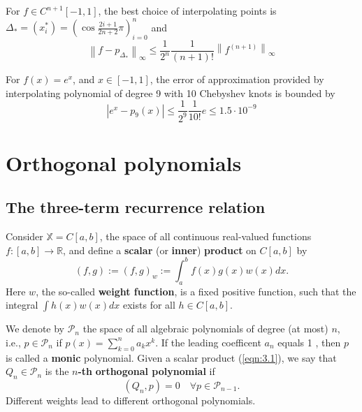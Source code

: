 \documentclass[a4paper]{article}
\begin{document}
\begin{theorem}
    For $f \in C^{n+1}[-1,1]$, the best choice of interpolating points is $\Delta_*=\left(x_i^*\right)=\left(\cos \frac{2 i+1}{2 n+2} \pi\right)_{i=0}^n$ and
    \[
    \left\|f-p_{\Delta_*}\right\|_{\infty} \leq \frac{1}{2^n} \frac{1}{(n+1) !}\left\|f^{(n+1)}\right\|_{\infty}
    \]
\end{theorem}

\begin{example}
    For $f(x)=e^x$, and $x \in[-1,1]$, the error of approximation provided by interpolating polynomial of degree 9 with 10 Chebyshev knots is bounded by
    \[
    \left|e^x-p_9(x)\right| \leq \frac{1}{2^9} \frac{1}{10 !} e \leq 1.5 \cdot 10^{-9}
    \]
\end{example}

\section{Orthogonal polynomials}
\subsection{The three-term recurrence relation}
Consider $\mathbb{X}=C[a, b]$, the space of all continuous real-valued functions $f:[a, b] \rightarrow \mathbb{R}$, and define a \textbf{scalar} (or \textbf{inner}) \textbf{product} on $C[a, b]$ by
\begin{equation}\label{eqn:3.1}
    (f, g):=(f, g)_w:=\int_a^b f(x) g(x) w(x) d x .
\end{equation}
Here $w$, the so-called \textbf{weight function}, is a fixed positive function, such that the integral $\int h(x) w(x) d x$ exists for all $h \in C[a, b]$.

We denote by $\mathcal{P}_n$ the space of all algebraic polynomials of degree (at most) $n$, i.e., $p \in \mathcal{P}_n$ if $p(x)=\sum_{k=0}^n a_k x^k$. If the leading coefficent $a_n$ equals 1 , then $p$ is called a \textbf{monic} polynomial. Given a scalar product (\ref{eqn:3.1}), we say that $Q_n \in \mathcal{P}_n$ is the $n$\textbf{-th} \textbf{orthogonal polynomial} if
\[
\left(Q_n, p\right)=0 \quad \forall p \in \mathcal{P}_{n-1} .
\]
Different weights lead to different orthogonal polynomials.
\end{document}
